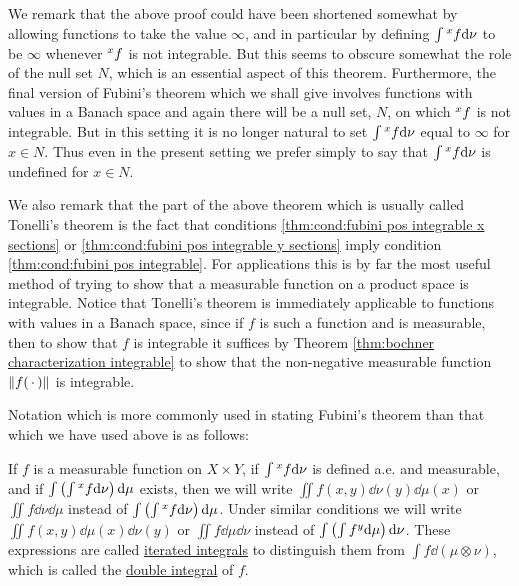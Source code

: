We remark that the above proof could have been shortened somewhat by allowing functions to take the value $\infty$, and in particular by defining $\int\xsec{f}{x}\dd\nu$ to be $\infty$ whenever $\xsec{f}{x}$ is not integrable. But this seems to obscure somewhat the role of the null set $N$, which is an essential aspect of this theorem. Furthermore, the final version of Fubini's theorem which we shall give involves functions with values in a Banach space and again there will be a null set, $N$, on which $\xsec{f}{x}$ is not integrable. But in this setting it is no longer natural to set $\int\xsec{f}{x}\dd\nu$ equal to $\infty$ for $x\in N$. Thus even in the present setting we prefer simply to say that $\int\xsec{f}{x}\dd\nu$ is undefined for $x\in N$.

We also remark that the part of the above theorem which is usually called Tonelli's theorem is the fact that conditions \ref{thm:cond:fubini pos integrable x sections} or \ref{thm:cond:fubini pos integrable y sections} imply condition \ref{thm:cond:fubini pos integrable}. For applications this is by far the most useful method of trying to show that a measurable function on a product space is integrable. Notice that Tonelli's theorem is immediately applicable to functions with values in a Banach space, since if $f$ is such a function and is measurable, then to show that $f$ is integrable it suffices by Theorem \ref{thm:bochner characterization integrable} to show that the non-negative measurable function $\norm{f(\imarg)}$ is integrable. %

Notation which is more commonly used in stating Fubini's theorem than that which we have used above is as follows:

\begin{definition}
If $f$ is a measurable function on $X\times Y$, if $\int\xsec{f}{x}\dd\nu$ is defined a.e. and measurable, and if $\int\br{\int\xsec{f}{x}\dd\nu}\dd\mu$ exists, then we will write $\iint f(x,y)\dd\nu(y)\dd\mu(x)$ or $\iint f\dd\nu\dd\mu$ instead of $\int\br{\int\xsec{f}{x}\dd\nu}\dd\mu$. Under similar conditions we will write $\iint f(x,y)\dd\mu(x)\dd\nu(y)$ or $\iint f\dd\mu\dd\nu$ instead of $\int\br{\int\ysec{f}{y}\dd\mu}\dd\nu$. These expressions are called \underline{iterated integrals} to distinguish them from $\int f\dd(\mu\otimes\nu)$, which is called the \underline{double integral} of $f$.
\end{definition}

